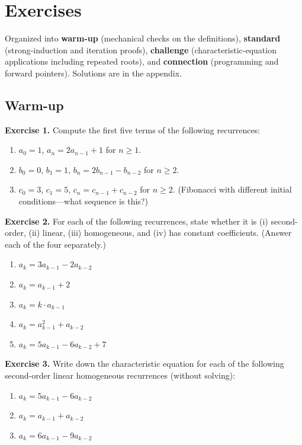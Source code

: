 \documentclass[11pt]{article}
\begin{document}
\section{Exercises}

Organized into \textbf{warm-up} (mechanical checks on the definitions), \textbf{standard} (strong-induction and iteration proofs), \textbf{challenge} (characteristic-equation applications including repeated roots), and \textbf{connection} (programming and forward pointers). Solutions are in the appendix.

\subsection*{Warm-up}

\textbf{Exercise 1.}\label{ex:m9:1} Compute the first five terms of the following recurrences:
\begin{enumerate}[label=(\alph*)]
  \item $a_0 = 1$, $a_n = 2 a_{n-1} + 1$ for $n \geq 1$.
  \item $b_0 = 0$, $b_1 = 1$, $b_n = 2 b_{n-1} - b_{n-2}$ for $n \geq 2$.
  \item $c_0 = 3$, $c_1 = 5$, $c_n = c_{n-1} + c_{n-2}$ for $n \geq 2$. (Fibonacci with different initial conditions---what sequence is this?)
\end{enumerate}

\bigskip
\textbf{Exercise 2.}\label{ex:m9:2} For each of the following recurrences, state whether it is (i) second-order, (ii) linear, (iii) homogeneous, and (iv) has constant coefficients. (Answer each of the four separately.)
\begin{enumerate}[label=(\alph*)]
  \item $a_k = 3 a_{k-1} - 2 a_{k-2}$
  \item $a_k = a_{k-1} + 2$
  \item $a_k = k \cdot a_{k-1}$
  \item $a_k = a_{k-1}^2 + a_{k-2}$
  \item $a_k = 5 a_{k-1} - 6 a_{k-2} + 7$
\end{enumerate}

\bigskip
\textbf{Exercise 3.}\label{ex:m9:3} Write down the characteristic equation for each of the following second-order linear homogeneous recurrences (without solving):
\begin{enumerate}[label=(\alph*)]
  \item $a_k = 5 a_{k-1} - 6 a_{k-2}$
  \item $a_k = a_{k-1} + a_{k-2}$
  \item $a_k = 6 a_{k-1} - 9 a_{k-2}$
\end{enumerate}
\end{document}

